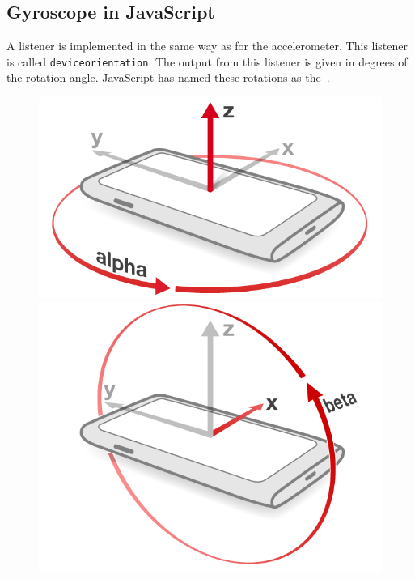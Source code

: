 \subsection{Gyroscope in JavaScript}\label{subsec:gyroJS}
A listener is implemented in the same way as for the accelerometer. This listener is called \texttt{deviceorientation}. The output from this listener is given in degrees of the rotation angle. JavaScript has named these rotations as the~.
\begin{figure}[H]
  \hspace{-1cm}
  \centering
  \begin{minipage}[c]{.23\textwidth}
    \centering
    \includegraphics[scale=0.2]{img/device-alpha}
  \end{minipage}
  \hspace{1cm}
  \begin{minipage}[c]{.23\textwidth}
    \centering
    \includegraphics[scale=0.2]{img/device-beta}

\end{minipage}
\end{figure}
